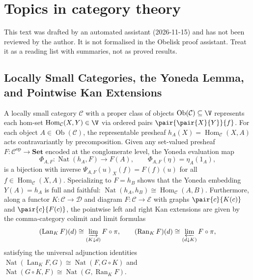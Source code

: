 \def\mypath{../}
\def\topic{Topics in category theory}

\section{Topics in category theory}
\begin{note}
This text was drafted by an automated assistant (2026-11-15) and has not been reviewed by the author.
It is not formalised in the Obelisk proof assistant. Treat it as a reading list with summaries, not as
proved results.
\end{note}

\subsection{Locally Small Categories, the Yoneda Lemma, and Pointwise Kan Extensions}
\label{subsec:yoneda_presheaves_and_kan_extensions}

A locally small category $\mathcal{C}$ with a proper class of objects $\operatorname{Ob}(\mathcal{C}) \subseteq \V$ represents each hom-set $\operatorname{Hom}_{\mathcal{C}}(X, Y) \in \V$ via ordered pairs $\pair{\pair{X}{Y}}{f}$. For each object $A \in \operatorname{Ob}(\mathcal{C})$, the representable presheaf $h_A(X) = \operatorname{Hom}_{\mathcal{C}}(X, A)$ acts contravariantly by precomposition. Given any set-valued presheaf $F\colon \mathcal{C}^{\mathrm{op}} \to \mathbf{Set}$ encoded at the conglomerate level, the Yoneda evaluation map
\[
\Phi_{A,F}\colon \operatorname{Nat}(h_A, F) \longrightarrow F(A), \qquad \Phi_{A,F}(\eta) = \eta_A(1_A),
\]
is a bijection with inverse $\Psi_{A,F}(u)_X(f) = F(f)(u)$ for all $f \in \operatorname{Hom}_{\mathcal{C}}(X, A)$. Specializing to $F = h_B$ shows that the Yoneda embedding $Y(A) = h_A$ is full and faithful: $\operatorname{Nat}(h_A, h_B) \cong \operatorname{Hom}_{\mathcal{C}}(A, B)$. Furthermore, along a functor $K\colon \mathcal{C} \to \mathcal{D}$ and diagram $F\colon \mathcal{C} \to \mathcal{E}$ with graphs $\pair{c}{K(c)}$ and $\pair{c}{F(c)}$, the pointwise left and right Kan extensions are given by the comma-category colimit and limit formulas
\[
(\operatorname{Lan}_K F)(d) \cong \varinjlim_{(K \downarrow d)} F \circ \pi, \qquad
(\operatorname{Ran}_K F)(d) \cong \varprojlim_{(d \downarrow K)} F \circ \pi,
\]
satisfying the universal adjunction identities $\operatorname{Nat}(\operatorname{Lan}_K F, G) \cong \operatorname{Nat}(F, G \circ K)$ and $\operatorname{Nat}(G \circ K, F) \cong \operatorname{Nat}(G, \operatorname{Ran}_K F)$.


